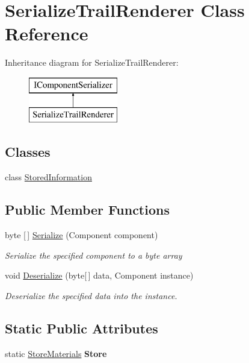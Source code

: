 \hypertarget{class_serialize_trail_renderer}{}\section{Serialize\+Trail\+Renderer Class Reference}
\label{class_serialize_trail_renderer}
Inheritance diagram for Serialize\+Trail\+Renderer\+:\begin{figure}[H]
\begin{center}
\leavevmode
\includegraphics[height=2.000000cm]{class_serialize_trail_renderer}
\end{center}
\end{figure}
\subsection*{Classes}
\begin{DoxyCompactItemize}
\item 
class \hyperlink{class_serialize_trail_renderer_1_1_stored_information}{Stored\+Information}
\end{DoxyCompactItemize}
\subsection*{Public Member Functions}
\begin{DoxyCompactItemize}
\item 
byte \mbox{[}$\,$\mbox{]} \hyperlink{class_serialize_trail_renderer_ab7177e5b5343bff3444f014b3a1f88de}{Serialize} (Component component)
\begin{DoxyCompactList}\small\item\em Serialize the specified component to a byte array \end{DoxyCompactList}\item 
void \hyperlink{class_serialize_trail_renderer_a9be87b05372daa6150e8e4522fa97568}{Deserialize} (byte\mbox{[}$\,$\mbox{]} data, Component instance)
\begin{DoxyCompactList}\small\item\em Deserialize the specified data into the instance. \end{DoxyCompactList}\end{DoxyCompactItemize}
\subsection*{Static Public Attributes}
\begin{DoxyCompactItemize}
\item 
\mbox{\label{class_serialize_trail_renderer_a58675d32c691c906cc9deebc07f9a238}} 
static \hyperlink{class_store_materials}{Store\+Materials} {\bfseries Store}
\end{DoxyCompactItemize}


